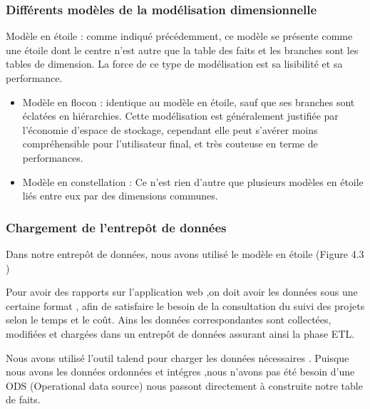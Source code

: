 \subsubsection{Diff\'{e}rents mod\`{e}les de la mod\'{e}lisation dimensionnelle}
 Mod\`{e}le en \'{e}toile : comme indiqu\'{e} pr\'{e}c\'{e}demment, ce mod\`{e}le se pr\'{e}sente comme
une \'{e}toile dont le centre n'est autre que la table des faits et les branches sont les tables
de dimension. La force de ce type de mod\'{e}lisation est sa lisibilit\'{e} et sa performance.



\begin{itemize}
  \item {Mod\`{e}le en flocon : identique au mod\`{e}le en \'{e}toile, sauf que ses branches sont \'{e}clat\'{e}es en hi\'{e}rarchies. Cette mod\'{e}lisation est g\'{e}n\'{e}ralement justifi\'{e}e par l'\'{e}conomie
d'espace de stockage, cependant elle peut s'av\'{e}rer moins compr\'{e}hensible pour l'utilisateur
final, et tr\`{e}s couteuse en terme de performances.}
  \item {Mod\`{e}le en constellation : Ce n'est rien d'autre que plusieurs mod\`{e}les en \'{e}toile
li\'{e}s entre eux par des dimensions communes. }
\end{itemize}




\subsubsection{Chargement de l'entrepôt  de donn\'{e}es}

Dans notre entrep\^{o}t de donn\'{e}es, nous avons utilis\'{e} le mod\`{e}le en \'{e}toile (Figure 4.3 )

Pour avoir des rapports sur l'application web ,on doit avoir les donn\'{e}es sous une certaine format ,
afin de satisfaire le besoin de la consultation du suivi des projets selon le temps et le co\^{u}t.
Ains les donn\'{e}es correspondantes sont collect\'{e}es, modifi\'{e}es et charg\'{e}es dans un entrep\^{o}t de donn\'{e}es
assurant ainsi la phase ETL.

Nous avons utilis\'{e} l'outil talend pour charger les donn\'{e}es n\'{e}cessaires .
Puisque nous avons les donn\'{e}es ordonn\'{e}es et int\'{e}gres ,nous n'avons pas \'{e}t\'{e} besoin d'une ODS (Operational data source)
nous passont directement \`{a} construite notre table de faits.


